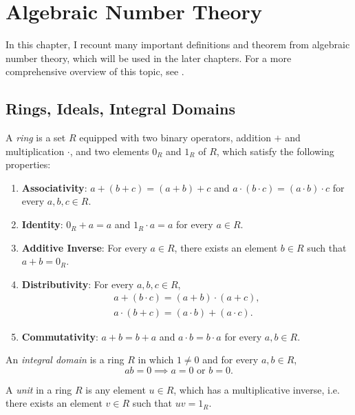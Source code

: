 \chapter{Algebraic Number Theory}
\label{ch:preliminaries}

In this chapter, I recount many important definitions and theorem from
algebraic number theory, which will be used in the later chapters.
For a more comprehensive overview of this topic, see \cite{Dummit04}.

\section{Rings, Ideals, Integral Domains}

\begin{definition}
  A \emph{ring} is a set $R$ equipped with two binary operators, addition $+$
  and multiplication $·$, and two elements $0_R$ and $1_R$ of $R$, which satisfy
  the following properties:
  \begin{enumerate}
    \item \textbf{Associativity}: $a + (b + c) = (a + b) + c$ and $a · (b · c) = (a · b) · c$ for every $a, b, c ∈ R$.
    \item \textbf{Identity}: $0_R + a = a$ and $1_R · a = a$ for every $a ∈ R$.
    \item \textbf{Additive Inverse}: For every $a ∈ R$, there exists an element $b ∈ R$ such that $a + b = 0_R$.
    \item \textbf{Distributivity}: For every $a, b, c ∈ R$,
      \begin{align*}
        a + (b · c) = (a + b) · (a + c), \\
        a · (b + c) = (a · b) + (a · c).
      \end{align*}
    \item \textbf{Commutativity}: $a + b = b + a$ and $a · b = b · a$ for every $a, b ∈ R$.
  \end{enumerate}
\end{definition}

\begin{definition}
  An \emph{integral domain} is a ring $R$ in which $1 ≠ 0$ and for every $a, b ∈ R$,
  \[
    ab = 0 \implies a = 0 \text{ or } b = 0.
  \]
\end{definition}

\begin{definition}
  A \emph{unit} in a ring $R$ is any element $u ∈ R$,
  which has a multiplicative inverse,
  i.e. there exists an element $v ∈ R$ such that $uv = 1_R$.
\end{definition}

